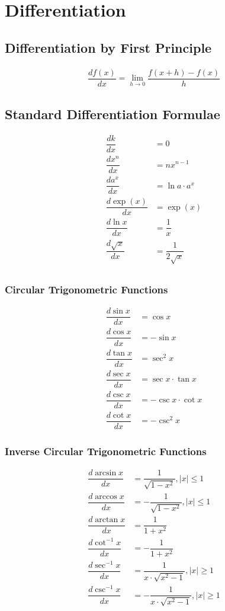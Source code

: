 \documentclass[../main.tex]{subfile}
\begin{document}
    \chapter{Differentiation}
    \section{Differentiation by First Principle}
    \begin{align}
        \dfrac{df(x)}{dx} = \lim_{h \to 0} \dfrac{f(x + h) - f(x)}{h}
    \end{align}

    \section{Standard Differentiation Formulae}
    \begin{align}
        \dfrac{dk}{dx} & = 0\\
        \dfrac{dx^n}{dx} & = nx^{n - 1}\\
        \dfrac{da^x}{dx} & = \ln a \cdot a^x\\
        \dfrac{d\exp(x)}{dx} & = \exp(x)\\
        \dfrac{d\ln x}{dx} & = \dfrac{1}{x}\\
        \dfrac{d\sqrt{x}}{dx} & = \dfrac{1}{2\sqrt{x}}\\
    \end{align}
    \subsection{Circular Trigonometric Functions}
    \begin{align}
        \dfrac{d\sin x}{dx} & = \cos x\\
        \dfrac{d\cos x}{dx} & = -\sin x\\
        \dfrac{d\tan x}{dx} & = \sec^2 x\\
        \dfrac{d\sec x}{dx} & = \sec x \cdot \tan x\\
        \dfrac{d\csc x}{dx} & = -\csc x \cdot \cot x\\
        \dfrac{d\cot x}{dx} & = -\csc^2 x
    \end{align}
    \subsection{Inverse Circular Trigonometric Functions}
    \begin{align}
        \dfrac{d\arcsin x}{dx} & = \dfrac{1}{\sqrt{1 - x^2}}, \lvert x \rvert \leq 1\\
        \dfrac{d\arccos x}{dx} & = -\dfrac{1}{\sqrt{1 - x^2}}, \lvert x \rvert \leq 1\\
        \dfrac{d\arctan x}{dx} & = \dfrac{1}{1 + x^2}\\
        \dfrac{d\cot^{-1} x}{dx} & = -\dfrac{1}{1 + x^2}\\
        \dfrac{d\sec^{-1} x}{dx} & = \dfrac{1}{x \cdot \sqrt{x^2 - 1}}, \lvert x \rvert \geq 1\\
        \dfrac{d\csc^{-1} x}{dx} & = -\dfrac{1}{x \cdot \sqrt{x^2 - 1}}, \lvert x \rvert \geq 1
    \end{align}
\end{document}
